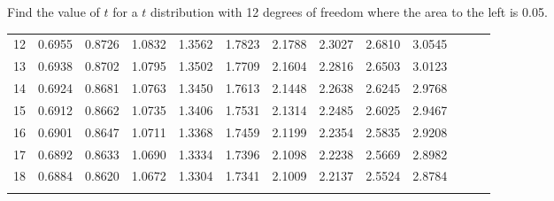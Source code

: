 \begin{frame}{\small Find the value of $t$ for a $t$ distribution with
    12 degrees of freedom where the area to the left is 0.05.}
{\begin{tabular}{l|llllllllllll}
\rowcolor{light-red} 12 & 0.6955 & 0.8726 & 1.0832 & 1.3562 & 1.7823 & 2.1788 & 2.3027 & 2.6810 & 3.0545  \\[5pt] \arrayrulecolor{light-gray}\hline\arrayrulecolor{black}  
 13 & 0.6938 & 0.8702 & 1.0795 & 1.3502 & 1.7709 & 2.1604 & 2.2816 & 2.6503 & 3.0123  \\[5pt] \arrayrulecolor{light-gray}\hline\arrayrulecolor{black}  
 14 & 0.6924 & 0.8681 & 1.0763 & 1.3450 & 1.7613 & 2.1448 & 2.2638 & 2.6245 & 2.9768  \\[12pt] \arrayrulecolor{light-gray}\hline\arrayrulecolor{black}  
 15 & 0.6912 & 0.8662 & 1.0735 & 1.3406 & 1.7531 & 2.1314 & 2.2485 & 2.6025 & 2.9467  \\[5pt] \arrayrulecolor{light-gray}\hline\arrayrulecolor{black}  
 16 & 0.6901 & 0.8647 & 1.0711 & 1.3368 & 1.7459 & 2.1199 & 2.2354 & 2.5835 & 2.9208  \\[5pt] \arrayrulecolor{light-gray}\hline\arrayrulecolor{black}  
 17 & 0.6892 & 0.8633 & 1.0690 & 1.3334 & 1.7396 & 2.1098 & 2.2238 & 2.5669 & 2.8982  \\[5pt] \arrayrulecolor{light-gray}\hline\arrayrulecolor{black}  
 18 & 0.6884 & 0.8620 & 1.0672 & 1.3304 & 1.7341 & 2.1009 & 2.2137 & 2.5524 & 2.8784  \\[5pt] \arrayrulecolor{light-gray}\hline\arrayrulecolor{black}  
\end{tabular}
}


\end{frame}

